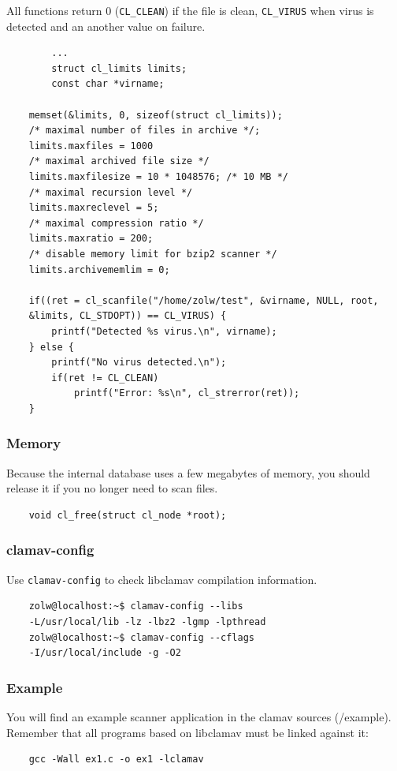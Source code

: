\documentclass[a4paper,titlepage,12pt]{article}
\begin{document}
    All functions return 0 (\verb+CL_CLEAN+) if the file is clean,
    \verb+CL_VIRUS+ when virus is detected and an another value on failure.
    \begin{verbatim}
	    ...
	    struct cl_limits limits;
	    const char *virname;

	memset(&limits, 0, sizeof(struct cl_limits));
	/* maximal number of files in archive */;
	limits.maxfiles = 1000
	/* maximal archived file size */
	limits.maxfilesize = 10 * 1048576; /* 10 MB */
	/* maximal recursion level */
	limits.maxreclevel = 5;
	/* maximal compression ratio */
	limits.maxratio = 200;
	/* disable memory limit for bzip2 scanner */
	limits.archivememlim = 0;

	if((ret = cl_scanfile("/home/zolw/test", &virname, NULL, root,
	&limits, CL_STDOPT)) == CL_VIRUS) {
	    printf("Detected %s virus.\n", virname);
	} else {
	    printf("No virus detected.\n");
	    if(ret != CL_CLEAN)
	        printf("Error: %s\n", cl_strerror(ret));
	}
    \end{verbatim}

    \subsubsection{Memory}
    Because the internal database uses a few megabytes of memory, you should
    release it if you no longer need to scan files.
    \begin{verbatim}
	void cl_free(struct cl_node *root);
    \end{verbatim}

    \subsubsection{clamav-config}
    Use \verb+clamav-config+ to check libclamav compilation information.
    \begin{verbatim}
	zolw@localhost:~$ clamav-config --libs
	-L/usr/local/lib -lz -lbz2 -lgmp -lpthread
	zolw@localhost:~$ clamav-config --cflags
	-I/usr/local/include -g -O2
    \end{verbatim}

    \subsubsection{Example}
    You will find an example scanner application in the clamav sources
    (/example). Remember that all programs based on libclamav must be linked
    against it:
    \begin{verbatim}
	gcc -Wall ex1.c -o ex1 -lclamav
    \end{verbatim}
\end{document}
